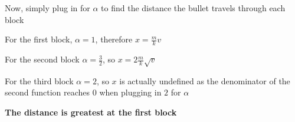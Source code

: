 \documentclass{article}
\begin{document}
\noindent Now, simply plug in for $\alpha$ to find the distance the bullet travels through each block \par\vspace{0.25cm}

\noindent For the first block, $\alpha = 1$, therefore $x = \frac{m}{k}v$ \par
\noindent For the second block $\alpha = \frac{3}{2}$, so $x = 2\frac{m}{k}\sqrt{v}$ \par
\noindent For the third block $\alpha = 2$, so $x$ is actually undefined as the denominator of the second function reaches $0$ when plugging in $2$ for $\alpha$ \par\vspace{0.25cm}

\noindent \textbf{The distance is greatest at the first block}
\end{document}
